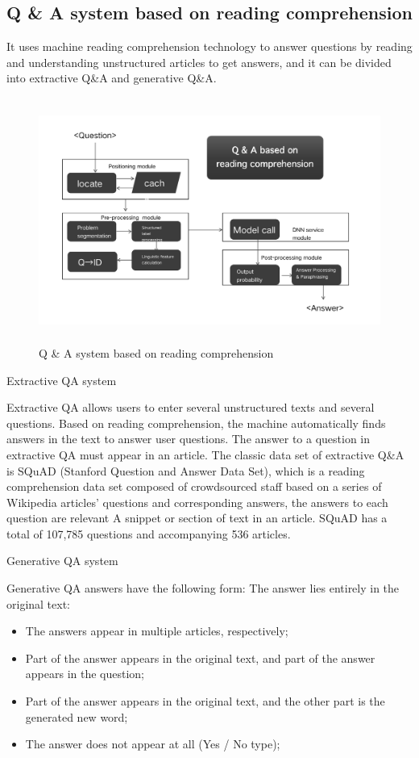 \documentclass[11pt,en,number]{elegantpaper}
\begin{document}
	\subsection{Q \& A system based on reading comprehension}
	It uses machine reading comprehension technology to answer questions by reading and understanding unstructured articles to get answers, and it can be divided into extractive Q\&A and generative Q\&A\cite{9}.
	\begin{figure}[H]
		\centering
		\includegraphics[width=13cm, height=8cm]{RC}
		\caption{Q \& A system based on reading comprehension}
	\end{figure}
	Extractive QA system
	
	Extractive QA allows users to enter several unstructured texts and several questions. Based on reading comprehension, the machine automatically finds answers in the text to answer user questions. The answer to a question in extractive QA must appear in an article\cite{10}.
	The classic data set of extractive Q\&A is SQuAD (Stanford Question and Answer Data Set), which is a reading comprehension data set composed of crowdsourced staff based on a series of Wikipedia articles' questions and corresponding answers, the answers to each question are relevant A snippet or section of text in an article. SQuAD has a total of 107,785 questions and accompanying 536 articles.
	
	Generative QA system
	
	Generative QA answers have the following form\cite{11}:
	The answer lies entirely in the original text:
	\begin{itemize}
		\item The answers appear in multiple articles, respectively;
		\item Part of the answer appears in the original text, and part of the answer appears in the question;
		\item Part of the answer appears in the original text, and the other part is the generated new word;
		\item The answer does not appear at all (Yes / No type);
	\end{itemize}
\end{document}

